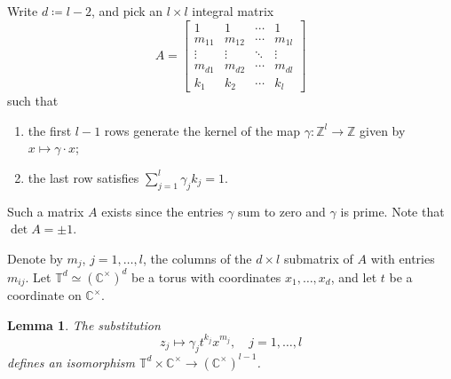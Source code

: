 \documentclass[11pt, reqno]{amsart}
\theoremstyle{plain}
\newtheorem{lem}[thm]{Lemma}
\theoremstyle{definition}
\newcommand{\CC}{\mathbb{C}}
\newcommand{\ZZ}{\mathbb{Z}}
\newcommand{\TT}{\mathbb{T}}
\begin{document}
Write $d \coloneqq l-2$, and pick an $l \times l$ integral matrix 
\begin{equation}\label{eq:matrix-gamma}
A= \begin{bmatrix}
1 & 1 & \cdots & 1 \\
m_{11} & m_{12} & \cdots & m_{1l} \\
\vdots & \vdots & \ddots & \vdots \\
m_{d1} & m_{d2} & \cdots & m_{dl} \\
k_1 & k_2 & \cdots & k_l
\end{bmatrix}
\end{equation}
such that 
\begin{enumerate}
    \item the first $l-1$ rows generate the kernel of the map $\gamma \colon \ZZ^l \to \ZZ$ given by $x \mapsto \gamma \cdot x$; 
    \item the last row satisfies $\sum_{j=1}^{l} \gamma_j k_j=1$.
\end{enumerate} 
Such a matrix $A$ exists since the entries $\gamma$ sum to zero and $\gamma$ is prime. Note that $\det A=\pm 1$. 
\smallskip

Denote by $m_j$, $j=1, \dots, l$, the columns of the $d \times l$ submatrix of ${A}$ with entries $m_{ij}$. Let $\TT^d \simeq (\CC^\times)^d$ be a torus with coordinates $x_1, \dots, x_d$, and let $t$ be a coordinate on $\CC^\times$.

\begin{lem}
\label{lem:change-of-variable}
The substitution 
   \[z_j \mapsto \gamma_j t^{k_j} x^{m_j}, \quad
j=1, \dots, l\] 
defines an isomorphism \mbox{$\TT^d \times \CC^\times \to (\CC^\times)^{l-1}$}. 
\end{lem}
\end{document}
